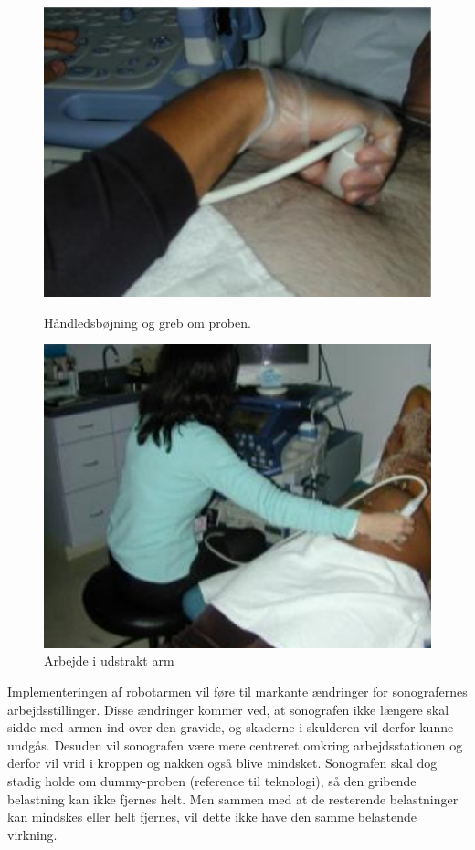 \begin{figure}[H]
  \begin{minipage}{0.49\textwidth}
    \centering
      \includegraphics[width=\textwidth]{Figurer/wrist.jpg}
      \caption{Håndledsbøjning og greb om proben.}
    \label{wrist}
  \end{minipage}
  \hspace{0.02\textwidth}
  \begin{minipage}{0.47\textwidth}
    \centering
      \includegraphics[width=\textwidth]{Figurer/arm.jpg}
      \caption{Arbejde i udstrakt arm}
    \label{udstraktArm}
  \end{minipage}
\end{figure}
Implementeringen af robotarmen vil føre til markante ændringer for sonografernes arbejdsstillinger. Disse ændringer kommer ved, at sonografen ikke længere skal sidde med armen ind over den gravide, og skaderne i skulderen vil derfor kunne undgås. Desuden vil sonografen være mere centreret omkring arbejdsstationen og derfor vil vrid i kroppen og nakken også blive mindsket. Sonografen skal dog stadig holde om dummy-proben (reference til teknologi), så den gribende belastning kan ikke fjernes helt. Men sammen med at de resterende belastninger kan mindskes eller helt fjernes, vil dette ikke have den samme belastende virkning. 


